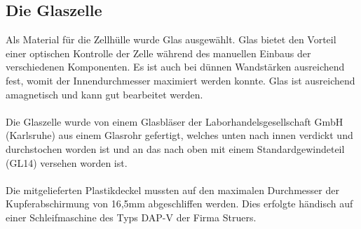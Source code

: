 \documentclass[a4paper, 11pt, headsepline,footsepline,twoside,abstract]{scrbook}
\begin{document}
\subsection{Die Glaszelle}
Als Material für die Zellhülle wurde Glas ausgewählt. Glas bietet den Vorteil einer optischen Kontrolle der Zelle während des manuellen Einbaus der verschiedenen Komponenten. Es ist auch bei dünnen Wandstärken ausreichend fest, womit der Innendurchmesser maximiert werden konnte. Glas ist ausreichend amagnetisch und kann gut bearbeitet werden.
\\\\
Die Glaszelle wurde von einem Glasbläser der Laborhandelsgesellschaft GmbH (Karlsruhe) aus einem Glasrohr gefertigt, welches unten nach innen verdickt und durchstochen worden ist und an das nach oben mit einem Standardgewindeteil (GL14) versehen worden ist.
\\\\
Die mitgelieferten Plastikdeckel mussten auf den maximalen Durchmesser der Kupferabschirmung von 16,5mm abgeschliffen werden. Dies erfolgte händisch auf einer Schleifmaschine des Typs DAP-V der Firma Struers.
\end{document}

